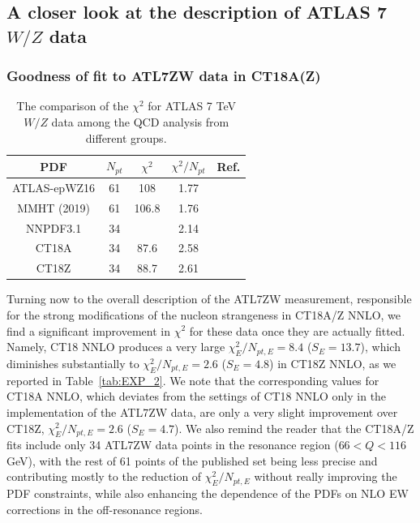 \subsection{A closer look at the description of ATLAS 7 $W/Z$ data}
\label{sec:CT18Z_qual}


\subsubsection{Goodness of fit to ATL7ZW data in CT18A(Z)}
\label{sec:ATL7ZWchi2}

\begin{table}[tb]
\caption{The comparison of the $\chi^{2}$ for ATLAS 7 TeV $W/Z$ data among the QCD analysis from different groups.}
\label{tab:CMN}
\begin{tabular}{c|c|c|c|c}
\hline\hline
PDF & $N_{\mathit{pt}}$ & $\chi^{2}$ & $\chi^{2}/N_{\mathit{pt}}$ & Ref. \\
\hline
ATLAS-epWZ16 & 61 & 108 & 1.77 & \cite{Aaboud:2016btc}\\
MMHT (2019) &  61 & 106.8  & 1.76 &  \cite{Thorne:2019mpt}\\
NNPDF3.1 & 34 &  & 2.14 & \cite{Ball:2017nwa} \\
CT18A &  34  & 87.6  & 2.58 & \\
CT18Z & 34 & 88.7 & 2.61  & \\
\hline\hline
\end{tabular}
\end{table}

%
Turning now to the overall description of the ATL7ZW measurement, responsible for the strong modifications of the nucleon strangeness in CT18A/Z NNLO, we find
a significant improvement in $\chi^2$ for these data once they are actually fitted. Namely, CT18 NNLO produces a very large
$\chi^2_E/N_\mathit{pt,E}\!=\! 8.4$ ($S_E\! =\! 13.7$), which diminishes substantially to
$\chi^2_E/N_\mathit{pt,E}\!=\! 2.6$ ($S_E\! =\! 4.8$) in CT18Z NNLO, as we reported in
Table~\ref{tab:EXP_2}. We note that the corresponding values for CT18A NNLO, which deviates from
the settings of CT18 NNLO only in the implementation of the ATL7ZW data, are only a very
slight improvement over CT18Z, $\chi^2_E/N_\mathit{pt,E}\!=\! 2.6$ ($S_E\! =\! 4.7$). 
We also remind the reader that the CT18A/Z fits include only 34 ATL7ZW data points in the resonance region ($66 < Q < 116$ GeV), with the rest of 61 points of the published set being less precise and contributing mostly to the reduction of $\chi^2_E/N_{pt,E}$ without really improving the PDF constraints, while also enhancing the dependence of the PDFs on NLO EW corrections in the off-resonance regions. 


